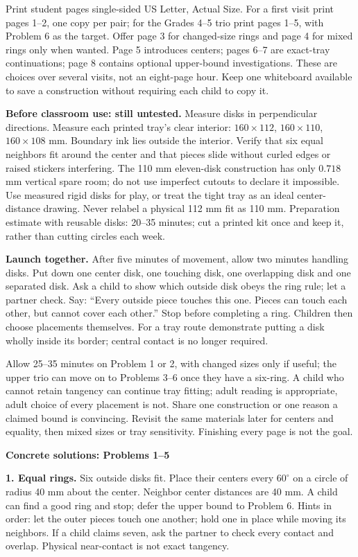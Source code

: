 \documentclass[11pt]{article}
\newcommand{\heading}[1]{\par\textbf{#1}\par}
\begin{document}
Print student pages single-sided US Letter, Actual Size. For a first visit print pages 1--2, one copy per pair; for the Grades 4--5 trio print pages 1--5, with Problem 6 as the target. Offer page 3 for changed-size rings and page 4 for mixed rings only when wanted. Page 5 introduces centers; pages 6--7 are exact-tray continuations; page 8 contains optional upper-bound investigations. These are choices over several visits, not an eight-page hour. Keep one whiteboard available to save a construction without requiring each child to copy it.

\textbf{Before classroom use: still untested.} Measure disks in perpendicular directions. Measure each printed tray's clear interior: $160\times 112$, $160\times 110$, $160\times 108$ mm. Boundary ink lies outside the interior. Verify that six equal neighbors fit around the center and that pieces slide without curled edges or raised stickers interfering. The 110 mm eleven-disk construction has only $0.718$ mm vertical spare room; do not use imperfect cutouts to declare it impossible. Use measured rigid disks for play, or treat the tight tray as an ideal center-distance drawing. Never relabel a physical 112 mm fit as 110 mm. Preparation estimate with reusable disks: 20--35 minutes; cut a printed kit once and keep it, rather than cutting circles each week.

\textbf{Launch together.} After five minutes of movement, allow two minutes handling disks. Put down one center disk, one touching disk, one overlapping disk and one separated disk. Ask a child to show which outside disk obeys the ring rule; let a partner check. Say: ``Every outside piece touches this one. Pieces can touch each other, but cannot cover each other.'' Stop before completing a ring. Children then choose placements themselves. For a tray route demonstrate putting a disk wholly inside its border; central contact is no longer required.

Allow 25--35 minutes on Problem 1 or 2, with changed sizes only if useful; the upper trio can move on to Problems 3--6 once they have a six-ring. A child who cannot retain tangency can continue tray fitting; adult reading is appropriate, adult choice of every placement is not. Share one construction or one reason a claimed bound is convincing. Revisit the same materials later for centers and equality, then mixed sizes or tray sensitivity. Finishing every page is not the goal.
\newpage
\heading{Concrete solutions: Problems 1--5}
\textbf{1. Equal rings.} Six outside disks fit. Place their centers every $60^\circ$ on a circle of radius 40 mm about the center. Neighbor center distances are 40 mm. A child can find a good ring and stop; defer the upper bound to Problem 6. Hints in order: let the outer pieces touch one another; hold one in place while moving its neighbors. If a child claims seven, ask the partner to check every contact and overlap. Physical near-contact is not exact tangency.
\end{document}
